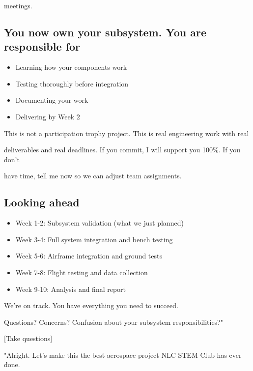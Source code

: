 \documentclass[11pt,letterpaper]{article}
\begin{document}
{meetings.\par

\subsection{You now own your subsystem. You are responsible for}

\begin{itemize}
  \item Learning how your components work
  \item Testing thoroughly before integration
  \item Documenting your work
  \item Delivering by Week 2
\end{itemize}

This is not a participation trophy project. This is real engineering work with real\par

deliverables and real deadlines. If you commit, I will support you 100\%. If you don't\par

have time, tell me now so we can adjust team assignments.\par

\subsection{Looking ahead}

\begin{itemize}
  \item Week 1-2: Subsystem validation (what we just planned)
  \item Week 3-4: Full system integration and bench testing
  \item Week 5-6: Airframe integration and ground tests
  \item Week 7-8: Flight testing and data collection
  \item Week 9-10: Analysis and final report
\end{itemize}

We're on track. You have everything you need to succeed.\par

Questions? Concerns? Confusion about your subsystem responsibilities?"\par

[Take questions]\par

"Alright. Let's make this the best aerospace project NLC STEM Club has ever done.\par

}
\end{document}
